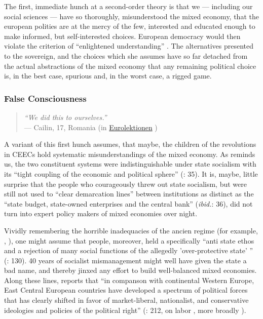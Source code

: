 The first, immediate hunch at a second-order theory is that we --- including our social sciences --- have so thoroughly, misunderstood the mixed economy, that the european polities are at the mercy of the few, interested and educated enough to make informed, but self-interested choices. European democracy would then violate the criterion of ``enlightened understanding'' \citep{Dahl-1989-aa}. The alternatives presented to the sovereign, and the choices which she assumes have so far detached from the actual abstractions of the mixed economy that any remaining political choice is, in the best case, spurious and, in the worst case, a rigged game.

\subsubsection[False Consciousness]{False Consciousness}

\begin{quote}
	\emph{``We did this to ourselves.''}\\
	--- Cailin, 17, Romania (in \href{http://eurolektionen.de}{Eurolektionen} \citeyear{DeRuffray2010})
\end{quote}

A variant of this first hunch assumes, that maybe, the children of the revolutions in \glspl{CEEC} hold systematic misunderstandings of the mixed economy. As \citeauthor{Bonker2006} reminds us, the two constituent systems were indistinguishable under state socialism with its ``tight coupling of the economic and political sphere'' (\citeyear{Bonker2006}: 35). It is, maybe, little surprise that the people who courageously threw out state socialism, but were still not used to ``clear demarcation lines'' between institutions as distinct as the ``state budget, state-owned enterprises and the central bank'' (\emph{ibid.}: 36), did not turn into expert policy makers of mixed economies over night.

Vividly remembering the horrible inadequacies of the ancien regime (for example, \citealt{Szikra2009}, \citealt{Millard1992}), one might assume that people, moreover, held a specifically  ``anti state ethos and a rejection of many social functions of the allegedly 'over-protective state' '' (\citealt{Millard1992}: 130). 40 years of socialist mismanagement might well have given the state a bad name, and thereby jinxed any effort to build well-balanced mixed economies. Along these lines, \citeauthor{Inglot2008} reports that ``in companson with continental Western Europe, East Central European countries have developed a spectrum of political forces that has clearly shifted in favor of market-liberal, nationalist, and conservative ideologies and policies of the political right'' (\citeyear{Inglot2008}: 212, on labor \citealt{Crowley2002}, more broadly \citealt{OrenOuto2001}).

